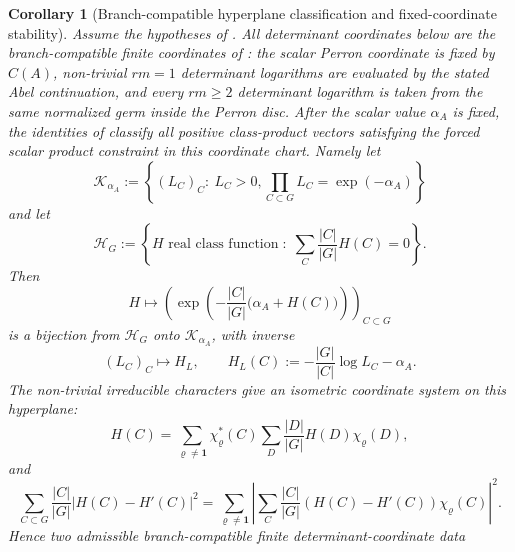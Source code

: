 \documentclass[11pt,a4paper]{amsart}
\theoremstyle{plain}
\newtheorem{corollary}[theorem]{Corollary}
\theoremstyle{definition}
\theoremstyle{remark}
\begin{document}
\begin{corollary}[Branch-compatible hyperplane classification and fixed-coordinate stability]
  \label{cor:class-product-hyperplane-stability}
  \label{cor:class-product-stability-scalar-independence}
  Assume the hypotheses of .  All
  determinant coordinates below are the branch-compatible finite coordinates
  of : the scalar Perron
  coordinate is fixed by \(C(A)\), non-trivial \(rm=1\) determinant
  logarithms are evaluated by the stated Abel continuation, and every
  \(rm\ge2\) determinant logarithm is taken from the same normalized germ
  inside the Perron disc.  After the scalar value \(\alpha_A\) is fixed, the
  identities of  classify all
  positive class-product vectors satisfying the forced scalar product
  constraint in this coordinate chart.  Namely let
  \[
    \mathscr K_{\alpha_A}:=
    \left\{(L_C)_C:\ L_C>0,
      \prod_{C\subset G}L_C=\exp(-\alpha_A)\right\}
  \]
  and let
  \[
    \mathcal H_G:=
    \left\{H\text{ real class function}\;:\;
      \sum_C\frac{|C|}{|G|}H(C)=0\right\}.
  \]
  Then
  \begin{equation}\label{eq:class-product-coordinate-map}
    H\longmapsto
    \left(
      \exp\!\left(-\frac{|C|}{|G|}
        \bigl(\alpha_A+H(C)\bigr)\right)
    \right)_{C\subset G}
  \end{equation}
  is a bijection from \(\mathcal H_G\) onto
  \(\mathscr K_{\alpha_A}\), with inverse
  \begin{equation}\label{eq:class-product-coordinate-map-inverse}
    (L_C)_C\longmapsto H_L,
    \qquad
    H_L(C):=-\frac{|G|}{|C|}\log L_C-\alpha_A .
  \end{equation}
  The non-trivial irreducible characters give an isometric coordinate system
  on this hyperplane:
  \begin{equation}\label{eq:class-product-hyperplane-expansion}
    H(C)=
    \sum_{\varrho\ne\mathbf1}
      \chi_\varrho^\ast(C)
      \sum_D\frac{|D|}{|G|}H(D)\chi_\varrho(D),
  \end{equation}
  and
  \begin{equation}\label{eq:class-product-stability-isometry}
    \sum_{C\subset G}\frac{|C|}{|G|}|H(C)-H'(C)|^2
    =
    \sum_{\varrho\ne\mathbf1}
      \left|
        \sum_C\frac{|C|}{|G|}(H(C)-H'(C))\chi_\varrho(C)
      \right|^2 .
  \end{equation}
  Hence two admissible branch-compatible finite determinant-coordinate data

\end{corollary}
\end{document}
